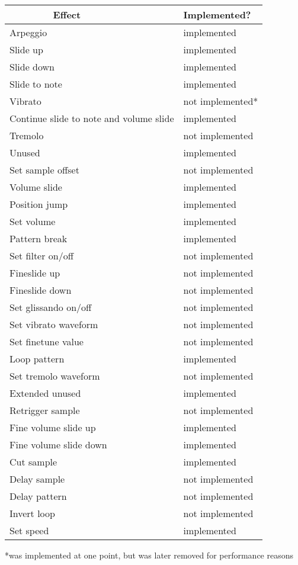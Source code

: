 \begin{table}[H]
	\centering
    \begin{tabular}{|l|l|}
        \hline
        Effect & Implemented? \\
        \hline
        \hline
        Arpeggio & implemented \\
        \hline
        Slide up & implemented \\
        \hline
        Slide down & implemented \\
        \hline
        Slide to note & implemented \\
        \hline
        Vibrato & not implemented* \\
        \hline
        Continue slide to note and volume slide & implemented \\
        \hline
        Tremolo & not implemented \\
        \hline
        Unused & implemented \\
        \hline
        Set sample offset & not implemented \\
        \hline
        Volume slide & implemented \\
        \hline
        Position jump & implemented \\
        \hline
        Set volume & implemented \\
        \hline
        Pattern break & implemented \\
        \hline
        Set filter on/off & not implemented \\
        \hline
        Fineslide up & not implemented \\
        \hline
        Fineslide down & not implemented \\
        \hline
        Set glissando on/off & not implemented \\
        \hline
        Set vibrato waveform & not implemented \\
        \hline
        Set finetune value & not implemented \\
        \hline
        Loop pattern & implemented \\
        \hline
        Set tremolo waveform & not implemented \\
        \hline
        Extended unused & implemented \\
        \hline
        Retrigger sample & not implemented \\
        \hline
        Fine volume slide up & implemented \\
        \hline
        Fine volume slide down & implemented \\
        \hline
        Cut sample & implemented \\
        \hline
        Delay sample & not implemented \\
        \hline
        Delay pattern & not implemented \\
        \hline
        Invert loop & not implemented \\
        \hline
        Set speed & implemented
    \end{tabular}
    \label{libmodam-feats}
\end{table}
*was implemented at one point, but was later removed for performance reasons


